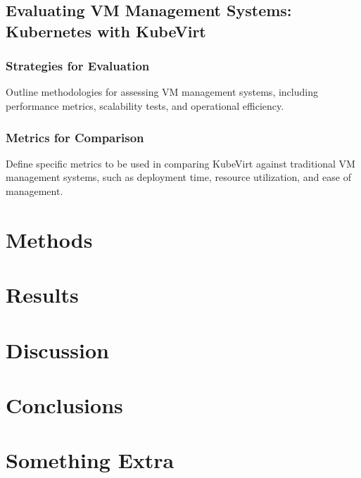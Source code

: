 \documentclass{kththesis}
\begin{document}
\section{Evaluating VM Management Systems: Kubernetes with KubeVirt}
\subsection{Strategies for Evaluation}
Outline methodologies for assessing VM management systems, including performance metrics, scalability tests, and operational efficiency.
\subsection{Metrics for Comparison}
Define specific metrics to be used in comparing KubeVirt against traditional VM management systems, such as deployment time, resource utilization, and ease of management.

\chapter{Methods}
\blindtext%

\chapter{Results}
\blindtext%

\chapter{Discussion}
\blindtext%

\chapter{Conclusions}
\blindtext%

\printbibliography[heading=bibintoc]

\appendix

\chapter{Something Extra}

\tailmatter%
\end{document}
